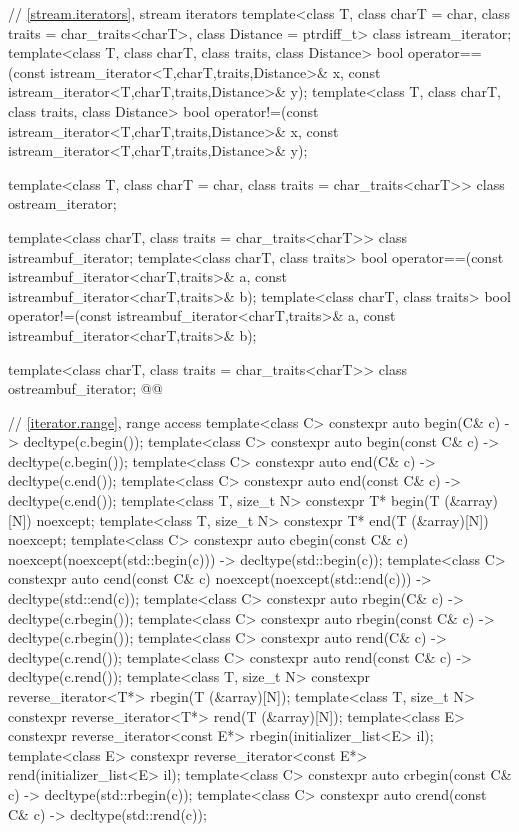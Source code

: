 \begin{codeblock}
{  // \ref{stream.iterators}, stream iterators
  template<class T, class charT = char, class traits = char_traits<charT>,
           class Distance = ptrdiff_t>
  class istream_iterator;
  template<class T, class charT, class traits, class Distance>
    bool operator==(const istream_iterator<T,charT,traits,Distance>& x,
            const istream_iterator<T,charT,traits,Distance>& y);
  template<class T, class charT, class traits, class Distance>
    bool operator!=(const istream_iterator<T,charT,traits,Distance>& x,
            const istream_iterator<T,charT,traits,Distance>& y);

  template<class T, class charT = char, class traits = char_traits<charT>>
      class ostream_iterator;

  template<class charT, class traits = char_traits<charT>>
    class istreambuf_iterator;
  template<class charT, class traits>
    bool operator==(const istreambuf_iterator<charT,traits>& a,
            const istreambuf_iterator<charT,traits>& b);
  template<class charT, class traits>
    bool operator!=(const istreambuf_iterator<charT,traits>& a,
            const istreambuf_iterator<charT,traits>& b);

  template<class charT, class traits = char_traits<charT>>
    class ostreambuf_iterator;
  @@

  // \ref{iterator.range}, range access
  template<class C> constexpr auto begin(C& c) -> decltype(c.begin());
  template<class C> constexpr auto begin(const C& c) -> decltype(c.begin());
  template<class C> constexpr auto end(C& c) -> decltype(c.end());
  template<class C> constexpr auto end(const C& c) -> decltype(c.end());
  template<class T, size_t N> constexpr T* begin(T (&array)[N]) noexcept;
  template<class T, size_t N> constexpr T* end(T (&array)[N]) noexcept;
  template<class C> constexpr auto cbegin(const C& c) noexcept(noexcept(std::begin(c)))
    -> decltype(std::begin(c));
  template<class C> constexpr auto cend(const C& c) noexcept(noexcept(std::end(c)))
    -> decltype(std::end(c));
  template<class C> constexpr auto rbegin(C& c) -> decltype(c.rbegin());
  template<class C> constexpr auto rbegin(const C& c) -> decltype(c.rbegin());
  template<class C> constexpr auto rend(C& c) -> decltype(c.rend());
  template<class C> constexpr auto rend(const C& c) -> decltype(c.rend());
  template<class T, size_t N> constexpr reverse_iterator<T*> rbegin(T (&array)[N]);
  template<class T, size_t N> constexpr reverse_iterator<T*> rend(T (&array)[N]);
  template<class E> constexpr reverse_iterator<const E*> rbegin(initializer_list<E> il);
  template<class E> constexpr reverse_iterator<const E*> rend(initializer_list<E> il);
  template<class C> constexpr auto crbegin(const C& c) -> decltype(std::rbegin(c));
  template<class C> constexpr auto crend(const C& c) -> decltype(std::rend(c));

}
\end{codeblock}
